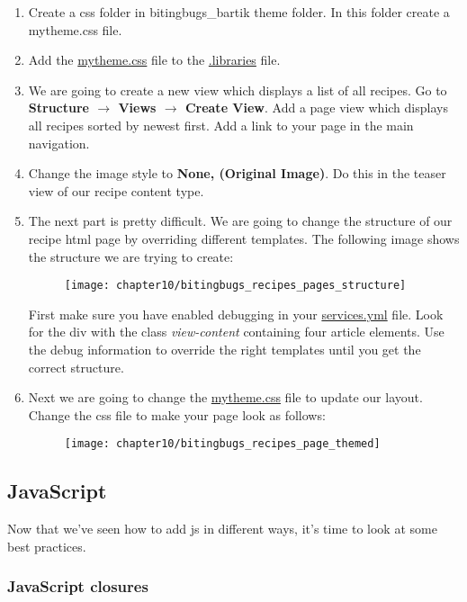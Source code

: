 \begin{enumerate}
	\item Create a css folder in bitingbugs\_bartik theme folder. In this folder create a mytheme.css file.
	\item Add the \url{mytheme.css} file to the \url{.libraries} file.
	\item We are going to create a new view which displays a list of all recipes. Go to \textbf{Structure $\rightarrow$ Views $\rightarrow$ Create View}. Add a page view which displays all recipes sorted by newest first. Add a link to your page in the main navigation.
	\item Change the image style to \textbf{None, (Original Image)}. Do this in the teaser view of our recipe content type.
	\item The next part is pretty difficult. We are going to change the structure of our recipe html page by overriding different templates. The following image shows the structure we are trying to create: 
	
	\begin{figure}[H]
		\centering
		\texttt{[image: chapter10/bitingbugs\_recipes\_pages\_structure]}
		\label{fig:bitingbugs_recipes_pages_structure}
	\end{figure}
	
	First make sure you have enabled debugging in your \url{services.yml} file. Look for the div with the class \textit{view-content} containing four article elements.
	Use the debug information to override the right templates until you get the correct structure.
	\item Next we are going to change the \url{mytheme.css} file to update our layout. Change the css file to make your page look as follows: 
	
	\begin{figure}[H]
		\centering
		\texttt{[image: chapter10/bitingbugs\_recipes\_page\_themed]}
		\label{fig:bitingbugs_recipes_page_themed}
	\end{figure}
	
\end{enumerate}

\subsection{JavaScript}

Now that we’ve seen how to add js in different ways, it’s time to look at some best practices.

\subsubsection{JavaScript closures}

